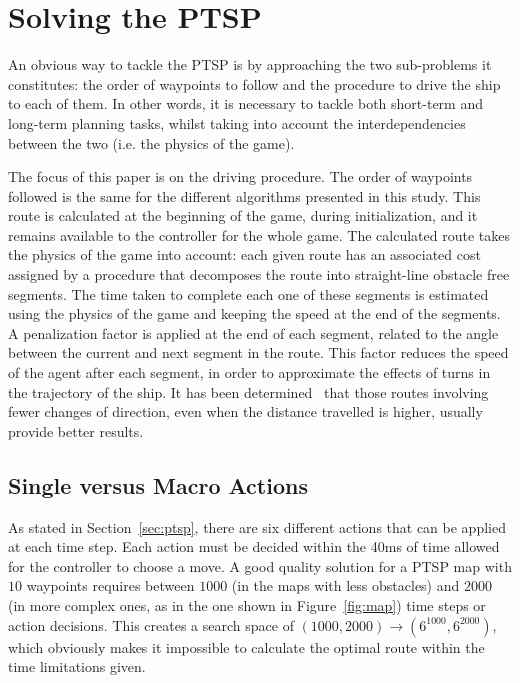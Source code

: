 \documentclass{sig-alternate}
\begin{document}
\section{Solving the PTSP} \label{sec:solve}

An obvious way to tackle the PTSP is by approaching the two sub-problems it constitutes: the order of waypoints to follow and the procedure to drive the ship to each of them. In other words, it is necessary to tackle both short-term and long-term planning tasks, whilst taking into account the interdependencies between the two (i.e. the physics of the game).

The focus of this paper is on the driving procedure. The order of waypoints followed is the same for the different algorithms presented in this study. This route is calculated at the beginning of the game, during initialization, and it remains available to the controller for the whole game. The calculated route takes the physics of the game into account: each given route has an associated cost assigned by a procedure that decomposes the route into straight-line obstacle free segments. The time taken to complete each one of these segments is estimated using the physics of the game and keeping the speed at the end of the segments. A penalization factor is applied at the end of each segment, related to the angle between the current and next segment in the route. This factor reduces the speed of the agent after each segment, in order to approximate the effects of turns in the trajectory of the ship. It has been determined~\cite{Perez2012a} that those routes involving fewer changes of direction, even when the distance travelled is higher, usually provide better results.


\subsection{Single versus Macro Actions} \label{sec:macro}

As stated in Section~\ref{sec:ptsp}, there are six different actions that can be applied at each time step. Each action must be decided within the 40ms of time allowed for the controller to choose a move. A good quality solution for a PTSP map with $10$ waypoints requires between $1000$ (in the maps with less obstacles) and $2000$ (in more complex ones, as in the one shown in Figure~\ref{fig:map}) time steps or action decisions. This creates a search space of $(1000,2000) \rightarrow (6^{1000}, 6^{2000})$, which obviously makes it impossible to calculate the optimal route within the time limitations given. 
\end{document}
